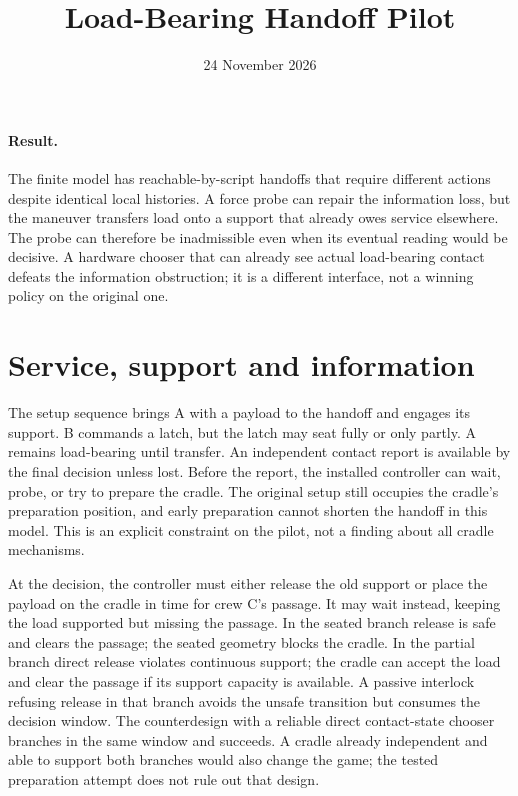 \documentclass[11pt]{article}
\title{Load-Bearing Handoff Pilot}
\author{}
\date{24 November 2026}
\begin{document}
\maketitle
\paragraph{Result.} The finite model has reachable-by-script handoffs that require different actions despite identical local histories. A force probe can repair the information loss, but the maneuver transfers load onto a support that already owes service elsewhere. The probe can therefore be inadmissible even when its eventual reading would be decisive. A hardware chooser that can already see actual load-bearing contact defeats the information obstruction; it is a different interface, not a winning policy on the original one.

\section{Service, support and information}
The setup sequence brings A with a payload to the handoff and engages its support. B commands a latch, but the latch may seat fully or only partly. A remains load-bearing until transfer. An independent contact report is available by the final decision unless lost. Before the report, the installed controller can wait, probe, or try to prepare the cradle. The original setup still occupies the cradle's preparation position, and early preparation cannot shorten the handoff in this model. This is an explicit constraint on the pilot, not a finding about all cradle mechanisms.

At the decision, the controller must either release the old support or place the payload on the cradle in time for crew C's passage. It may wait instead, keeping the load supported but missing the passage. In the seated branch release is safe and clears the passage; the seated geometry blocks the cradle. In the partial branch direct release violates continuous support; the cradle can accept the load and clear the passage if its support capacity is available. A passive interlock refusing release in that branch avoids the unsafe transition but consumes the decision window. The counterdesign with a reliable direct contact-state chooser branches in the same window and succeeds. A cradle already independent and able to support both branches would also change the game; the tested preparation attempt does not rule out that design.
\end{document}
